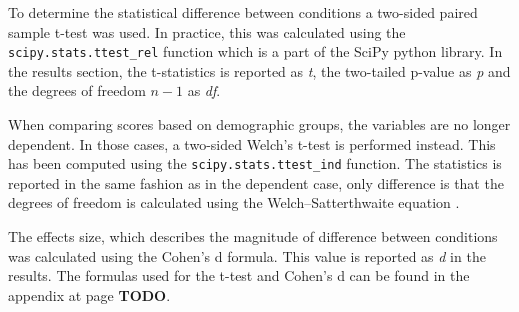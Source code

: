 To determine the statistical difference between conditions a two-sided paired sample t-test was used. In practice, this was calculated using the \texttt{scipy.stats.ttest\_rel} function which is a part of the SciPy python library. In the results section, the t-statistics is reported as \emph{t}, the two-tailed p-value as \emph{p} and the degrees of freedom $n-1$ as \emph{df}.

When comparing scores based on demographic groups, the variables are no longer dependent. In those cases, a two-sided Welch’s t-test is performed instead. This has been computed using the \texttt{scipy.stats.ttest\_ind} function. The statistics is reported in the same fashion as in the dependent case, only difference is that the degrees of freedom is calculated using the Welch–Satterthwaite equation \citep{Allwood2008}.

The effects size, which describes the magnitude of difference between conditions was calculated using the Cohen's d formula. This value is reported as \emph{d} in the results. The formulas used for the t-test and Cohen's d can be found in the appendix at page \textbf{TODO}.

